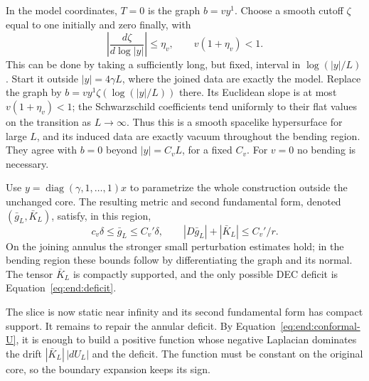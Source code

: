 In the model coordinates, $T=0$ is the graph $b=vy^1$.
Choose a smooth cutoff $\zeta$ equal to one initially and zero
finally, with
\[
 \left|\frac{d\zeta}{d\log |y|}\right|\le\eta_v,
 \qquad v(1+\eta_v)<1.
\]
This can be done by taking a sufficiently long, but fixed,
interval in $\log(|y|/L)$.  Start it outside $|y|=4\gamma L$,
where the joined data are exactly the model.  Replace the graph
by $b=vy^1\zeta(\log(|y|/L))$ there.  Its Euclidean slope is
at most $v(1+\eta_v)<1$; the Schwarzschild coefficients tend
uniformly to their flat values on the transition as $L\to\infty$.
Thus this is a smooth spacelike hypersurface for large $L$,
and its induced data are exactly vacuum throughout the bending
region.  They agree with $b=0$ beyond $|y|=C_vL$, for a fixed
$C_v$.  For $v=0$ no bending is necessary.

Use $y=\operatorname{diag}(\gamma,1,\ldots,1)x$ to parametrize
the whole construction outside the unchanged core.  The resulting
metric and second fundamental form, denoted $(\bar g_L,\bar K_L)$,
satisfy, in this region,
\begin{equation}\label{eq:end:bending-bounds}
 c_v\delta\le\bar g_L\le C_v'\delta,\qquad
 |D\bar g_L|+|\bar K_L|\le C_v'/r.
\end{equation}
On the joining annulus the stronger small perturbation estimates
hold; in the bending region these bounds follow by differentiating
the graph and its normal.  The tensor $\bar K_L$ is compactly
supported, and the only possible DEC deficit is
Equation~\eqref{eq:end:deficit}.

The slice is now static near infinity and its second fundamental
form has compact support.  It remains to repair the annular deficit.
By Equation~\eqref{eq:end:conformal-U}, it is enough to build a
positive function whose negative Laplacian dominates the drift
$|\bar K_L|\,|dU_L|$ and the deficit.  The function must be constant
on the original core, so the boundary expansion keeps its sign.

